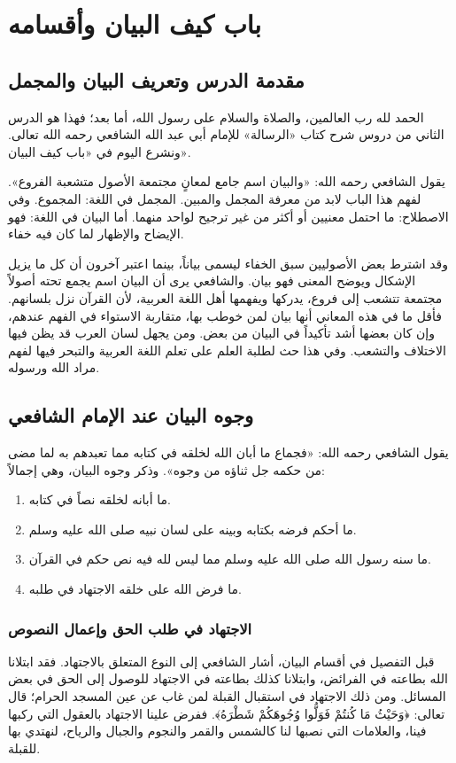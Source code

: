 \chapter{باب كيف البيان وأقسامه}

\section{مقدمة الدرس وتعريف البيان والمجمل}
الحمد لله رب العالمين، والصلاة والسلام على رسول الله، أما بعد؛ فهذا هو الدرس الثاني من دروس شرح كتاب «الرسالة» للإمام أبي عبد الله الشافعي رحمه الله تعالى. ونشرع اليوم في «باب كيف البيان».

يقول الشافعي رحمه الله: «والبيان اسم جامع لمعانٍ مجتمعة الأصول متشعبة الفروع».
لفهم هذا الباب لابد من معرفة المجمل والمبين.
المجمل في اللغة: المجموع. وفي الاصطلاح: ما احتمل معنيين أو أكثر من غير ترجيح لواحد منهما.
أما البيان في اللغة: فهو الإيضاح والإظهار لما كان فيه خفاء. 

وقد اشترط بعض الأصوليين سبق الخفاء ليسمى بياناً، بينما اعتبر آخرون أن كل ما يزيل الإشكال ويوضح المعنى فهو بيان. والشافعي يرى أن البيان اسم يجمع تحته أصولاً مجتمعة تتشعب إلى فروع، يدركها ويفهمها أهل اللغة العربية، لأن القرآن نزل بلسانهم. فأقل ما في هذه المعاني أنها بيان لمن خوطب بها، متقاربة الاستواء في الفهم عندهم، وإن كان بعضها أشد تأكيداً في البيان من بعض. ومن يجهل لسان العرب قد يظن فيها الاختلاف والتشعب. وفي هذا حث لطلبة العلم على تعلم اللغة العربية والتبحر فيها لفهم مراد الله ورسوله.

\section{وجوه البيان عند الإمام الشافعي}
يقول الشافعي رحمه الله: «فجماع ما أبان الله لخلقه في كتابه مما تعبدهم به لما مضى من حكمه جل ثناؤه من وجوه». وذكر وجوه البيان، وهي إجمالاً:
\begin{enumerate}
    \item ما أبانه لخلقه نصاً في كتابه.
    \item ما أحكم فرضه بكتابه وبينه على لسان نبيه صلى الله عليه وسلم.
    \item ما سنه رسول الله صلى الله عليه وسلم مما ليس لله فيه نص حكم في القرآن.
    \item ما فرض الله على خلقه الاجتهاد في طلبه.
\end{enumerate}

\subsection{الاجتهاد في طلب الحق وإعمال النصوص}
قبل التفصيل في أقسام البيان، أشار الشافعي إلى النوع المتعلق بالاجتهاد. فقد ابتلانا الله بطاعته في الفرائض، وابتلانا كذلك بطاعته في الاجتهاد للوصول إلى الحق في بعض المسائل. ومن ذلك الاجتهاد في استقبال القبلة لمن غاب عن عين المسجد الحرام؛ قال تعالى: ﴿وَحَيْثُ مَا كُنتُمْ فَوَلُّوا وُجُوهَكُمْ شَطْرَهُ﴾. ففرض علينا الاجتهاد بالعقول التي ركبها فينا، والعلامات التي نصبها لنا كالشمس والقمر والنجوم والجبال والرياح، لنهتدي بها للقبلة. 

